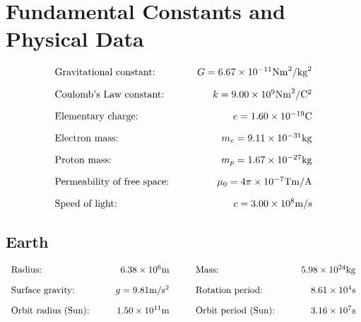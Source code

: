 \documentclass[12pt,a4paper]{article}
\begin{document}
\section{Fundamental Constants and Physical Data}

\begin{align*}
  \begin{array}{l@{\hspace{1cm}}r}
    \text{Gravitational constant:} & G=6.67 \times 10^{-11} \mathrm{Nm}^2/\mathrm{kg}^2 \\[1em]
    \text{Coulomb's Law constant:} & k=9.00 \times 10^9 \mathrm{Nm}^2/\mathrm{C}^2 \\[1em]
    \text{Elementary charge:} & e=1.60 \times 10^{-19} \mathrm{C} \\[1em]
    \text{Electron mass:} & m_e=9.11 \times 10^{-31} \mathrm{kg} \\[1em]
    \text{Proton mass:} & m_p=1.67 \times 10^{-27} \mathrm{kg} \\[1em]
    \text{Permeability of free space:} & \mu_0=4\pi \times 10^{-7} \mathrm{Tm}/\mathrm{A} \\[1em]
    \text{Speed of light:} & c=3.00 \times 10^8 \mathrm{m}/\mathrm{s}
  \end{array}
\end{align*}

\subsection{Earth}
\begin{align*}
  \begin{array}{l@{\hspace{1cm}}r@{\hspace{1cm}}l@{\hspace{1cm}}r}
    \text{Radius:} & 6.38 \times 10^6 \mathrm{m} & \text{Mass:} & 5.98 \times 10^{24} \mathrm{kg} \\[1em]
    \text{Surface gravity:} & g=9.81 \mathrm{m}/\mathrm{s}^2 & \text{Rotation period:} & 8.61 \times 10^4 \mathrm{s} \\[1em]
    \text{Orbit radius (Sun):} & 1.50 \times 10^{11} \mathrm{m} & \text{Orbit period (Sun):} & 3.16 \times 10^7 \mathrm{s}
  \end{array}
\end{align*}
\end{document}
